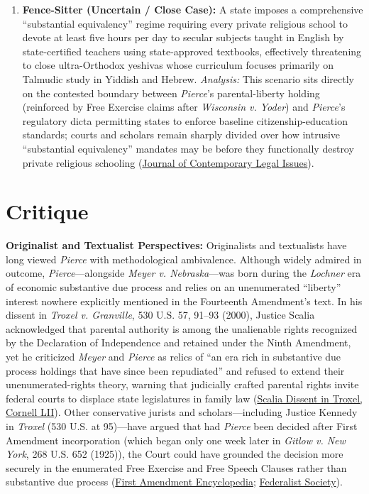 \documentclass[12pt]{article}
\begin{document}
\begin{enumerate}
    \item \textbf{Fence-Sitter (Uncertain / Close Case):} A state imposes a comprehensive ``substantial equivalency'' regime requiring every private religious school to devote at least five hours per day to secular subjects taught in English by state-certified teachers using state-approved textbooks, effectively threatening to close ultra-Orthodox yeshivas whose curriculum focuses primarily on Talmudic study in Yiddish and Hebrew. \textit{Analysis:} This scenario sits directly on the contested boundary between \textit{Pierce}'s parental-liberty holding (reinforced by Free Exercise claims after \textit{Wisconsin v. Yoder}) and \textit{Pierce}'s regulatory dicta permitting states to enforce baseline citizenship-education standards; courts and scholars remain sharply divided over how intrusive ``substantial equivalency'' mandates may be before they functionally destroy private religious schooling (\href{https://digital.sandiego.edu/cgi/viewcontent.cgi?article=1073&context=jcli}{Journal of Contemporary Legal Issues}).
\end{enumerate}

\section{Critique}
\textbf{Originalist and Textualist Perspectives:} Originalists and textualists have long viewed \textit{Pierce} with methodological ambivalence. Although widely admired in outcome, \textit{Pierce}---alongside \textit{Meyer v. Nebraska}---was born during the \textit{Lochner} era of economic substantive due process and relies on an unenumerated ``liberty'' interest nowhere explicitly mentioned in the Fourteenth Amendment's text. In his dissent in \textit{Troxel v. Granville}, 530 U.S. 57, 91--93 (2000), Justice Scalia acknowledged that parental authority is among the unalienable rights recognized by the Declaration of Independence and retained under the Ninth Amendment, yet he criticized \textit{Meyer} and \textit{Pierce} as relics of ``an era rich in substantive due process holdings that have since been repudiated'' and refused to extend their unenumerated-rights theory, warning that judicially crafted parental rights invite federal courts to displace state legislatures in family law (\href{https://www.law.cornell.edu/supct/html/99-138.ZD1.html}{Scalia Dissent in Troxel, Cornell LII}). Other conservative jurists and scholars---including Justice Kennedy in \textit{Troxel} (530 U.S. at 95)---have argued that had \textit{Pierce} been decided after First Amendment incorporation (which began only one week later in \textit{Gitlow v. New York}, 268 U.S. 652 (1925)), the Court could have grounded the decision more securely in the enumerated Free Exercise and Free Speech Clauses rather than substantive due process (\href{https://firstamendment.mtsu.edu/article/pierce-v-society-of-sisters/}{First Amendment Encyclopedia}; \href{https://fedsoc.org/case/pierce-v-society-of-sisters}{Federalist Society}).
\end{document}
